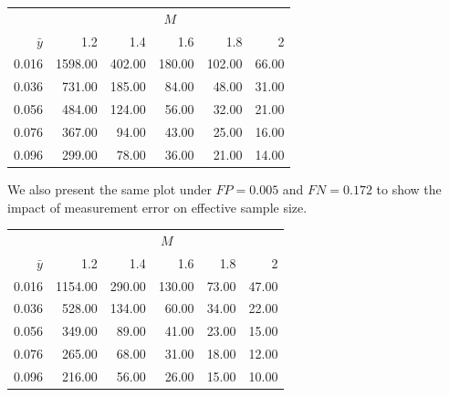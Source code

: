 \documentclass[aoas]{amsart}
\begin{document}
\begin{table}[ht]
\centering
\begin{tabular}{rrrrrr}
& \multicolumn{5}{c}{$M$} \\ \cline{2-6}
$\bar y$ & 1.2 & 1.4 & 1.6 & 1.8 & 2 \\
  \hline
0.016 & 1598.00 & 402.00 & 180.00 & 102.00 & 66.00 \\
  0.036 & 731.00 & 185.00 & 84.00 & 48.00 & 31.00 \\
  0.056 & 484.00 & 124.00 & 56.00 & 32.00 & 21.00 \\
  0.076 & 367.00 & 94.00 & 43.00 & 25.00 & 16.00 \\
  0.096 & 299.00 & 78.00 & 36.00 & 21.00 & 14.00 \\
   \hline
\end{tabular}
\end{table}


We also present the same plot under $FP = 0.005$ and $FN = 0.172$ to show the impact of measurement error on effective sample size.

\begin{table}[ht]
\centering
\begin{tabular}{rrrrrr}
  & \multicolumn{5}{c}{$M$} \\ \cline{2-6}
$\bar y$ & 1.2 & 1.4 & 1.6 & 1.8 & 2 \\
  \hline
0.016 & 1154.00 & 290.00 & 130.00 & 73.00 & 47.00 \\
  0.036 & 528.00 & 134.00 & 60.00 & 34.00 & 22.00 \\
  0.056 & 349.00 & 89.00 & 41.00 & 23.00 & 15.00 \\
  0.076 & 265.00 & 68.00 & 31.00 & 18.00 & 12.00 \\
  0.096 & 216.00 & 56.00 & 26.00 & 15.00 & 10.00 \\
   \hline
\end{tabular}
\end{table}





\end{document}
